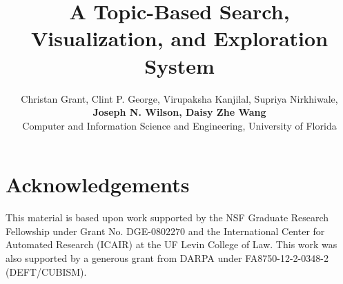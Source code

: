 \documentclass[letterpaper]{article}
\begin{document}
\title{A Topic-Based Search, Visualization, and Exploration System}
\author{Christan Grant, Clint P. George, Virupaksha Kanjilal, Supriya Nirkhiwale, \\ 
{\bf \Large Joseph N. Wilson, Daisy Zhe Wang}\\
Computer and Information Science and Engineering, University of Florida}

\maketitle









\section{Acknowledgements}

This material is based upon work supported by the NSF Graduate 
Research Fellowship under Grant No. 
DGE-$0802270$ and the International Center for Automated 
Research (ICAIR) at the UF Levin College of Law. 
This work was also supported by a generous grant from DARPA under
FA8750-12-2-0348-2 (DEFT/CUBISM).




\end{document}
